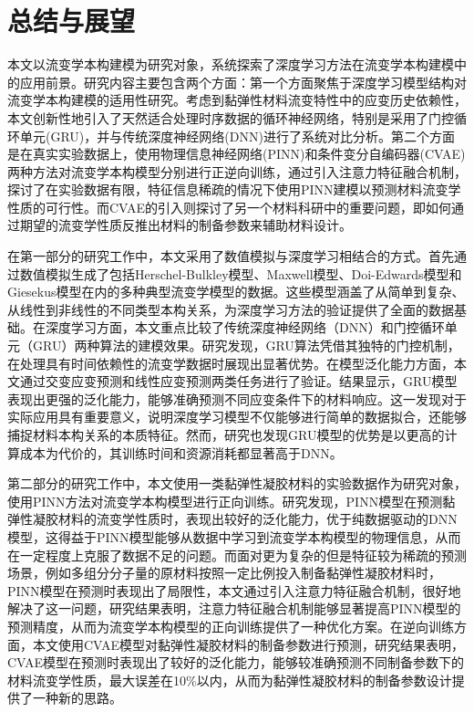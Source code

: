\chapter{总结与展望}
本文以流变学本构建模为研究对象，系统探索了深度学习方法在流变学本构建模中的应用前景。研究内容主要包含两个方面：第一个方面聚焦于深度学习模型结构对流变学本构建模的适用性研究。考虑到黏弹性材料流变特性中的应变历史依赖性，本文创新性地引入了天然适合处理时序数据的循环神经网络，特别是采用了门控循环单元(GRU)，并与传统深度神经网络(DNN)进行了系统对比分析。第二个方面是在真实实验数据上，使用物理信息神经网络(PINN)和条件变分自编码器(CVAE)两种方法对流变学本构模型分别进行正逆向训练，通过引入注意力特征融合机制，探讨了在实验数据有限，特征信息稀疏的情况下使用PINN建模以预测材料流变学性质的可行性。而CVAE的引入则探讨了另一个材料科研中的重要问题，即如何通过期望的流变学性质反推出材料的制备参数来辅助材料设计。

在第一部分的研究工作中，本文采用了数值模拟与深度学习相结合的方式。首先通过数值模拟生成了包括Herschel-Bulkley模型、Maxwell模型、Doi-Edwards模型和Giesekus模型在内的多种典型流变学模型的数据。这些模型涵盖了从简单到复杂、从线性到非线性的不同类型本构关系，为深度学习方法的验证提供了全面的数据基础。在深度学习方面，本文重点比较了传统深度神经网络（DNN）和门控循环单元（GRU）两种算法的建模效果。研究发现，GRU算法凭借其独特的门控机制，在处理具有时间依赖性的流变学数据时展现出显著优势。在模型泛化能力方面，本文通过交变应变预测和线性应变预测两类任务进行了验证。结果显示，GRU模型表现出更强的泛化能力，能够准确预测不同应变条件下的材料响应。这一发现对于实际应用具有重要意义，说明深度学习模型不仅能够进行简单的数据拟合，还能够捕捉材料本构关系的本质特征。然而，研究也发现GRU模型的优势是以更高的计算成本为代价的，其训练时间和资源消耗都显著高于DNN。

第二部分的研究工作中，本文使用一类黏弹性凝胶材料的实验数据作为研究对象，使用PINN方法对流变学本构模型进行正向训练。研究发现，PINN模型在预测黏弹性凝胶材料的流变学性质时，表现出较好的泛化能力，优于纯数据驱动的DNN模型，这得益于PINN模型能够从数据中学习到流变学本构模型的物理信息，从而在一定程度上克服了数据不足的问题。而面对更为复杂的但是特征较为稀疏的预测场景，例如多组分分子量的原材料按照一定比例投入制备黏弹性凝胶材料时，PINN模型在预测时表现出了局限性，本文通过引入注意力特征融合机制，很好地解决了这一问题，研究结果表明，注意力特征融合机制能够显著提高PINN模型的预测精度，从而为流变学本构模型的正向训练提供了一种优化方案。在逆向训练方面，本文使用CVAE模型对黏弹性凝胶材料的制备参数进行预测，研究结果表明，CVAE模型在预测时表现出了较好的泛化能力，能够较准确预测不同制备参数下的材料流变学性质，最大误差在10\%以内，从而为黏弹性凝胶材料的制备参数设计提供了一种新的思路。



